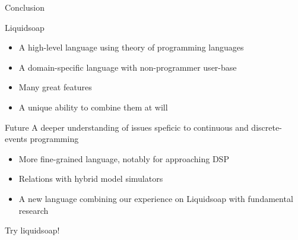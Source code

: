 \documentclass{beamer}
\renewcommand{\emph}[1]{\alert{#1}}
\begin{document}
\begin{frame}{Conclusion}

\begin{block}{Liquidsoap}
\begin{itemize}
\item<2-> A high-level language using theory of programming languages
\item<3-> A domain-specific language with non-programmer user-base
\item<4-> Many great features
\item<5-> A unique ability to combine them at will
\end{itemize}
\end{block}

\begin{block}{Future}
A deeper understanding of issues speficic
to continuous and discrete-events programming
\begin{itemize}
\item<7->More fine-grained language, notably for approaching DSP
\item<8->Relations with hybrid model simulators
\item<9->A new language combining our experience on Liquidsoap
with fundamental research
\end{itemize}
\end{block}

\vfill

\begin{center}
  \large \emph{Try liquidsoap!}
\end{center}

\end{frame}
\end{document}
